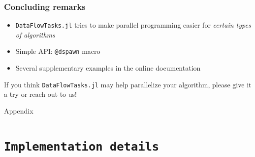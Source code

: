 \documentclass{beamer}
\newcommand{\DFT}{\texttt{DataFlowTasks.jl}}
\begin{document}

\begin{frame}
\frametitle{Concluding remarks}

\begin{itemize}
  \item \DFT{} tries to make parallel programming easier for \emph{certain types of algorithms}
  \item Simple API: \texttt{@dspawn} macro
  \item Several supplementary examples in the online documentation
\end{itemize} 

\bigskip

\begin{block}{}
\end{block}

\bigskip

\center If you think \DFT{} may help parallelize your algorithm, please give it
a try or reach out to us!

\end{frame}

\appendix

\begin{frame}
  \begin{center}
    \Huge Appendix
  \end{center}
\end{frame}

\section{\texttt{Implementation details}}
\end{document}
